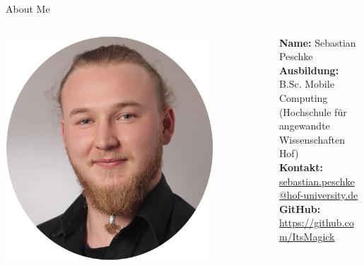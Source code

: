 
\begin{frame}{About Me}
    \begin{columns}[T] %
        \begin{column}{0.4\textwidth} %
            \centering
            \includegraphics[width=0.8\textwidth]{res/Bewerbungsfoto} %
            \vspace{0.2cm}
        \end{column}

        \begin{column}{0.6\textwidth} %
            \textbf{Name:} Sebastian Peschke \\
            \textbf{Ausbildung:} B.Sc. Mobile Computing \\(Hochschule für angewandte Wissenschaften Hof) \\
            \textbf{Kontakt:} \\
            \href{mailto:sebastian.peschke@hof-university.de}{sebastian.peschke@hof-university.de} \\
            \textbf{GitHub:} \\
            \href{https://github.com/ItsMagick}{https://github.com/ItsMagick}
        \end{column}
    \end{columns}
\end{frame}